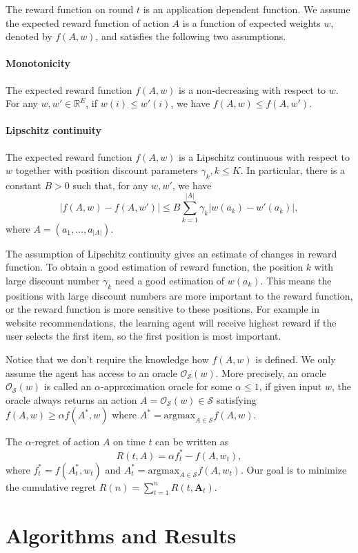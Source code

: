 \documentclass{article}
\newcommand{\RR}{\mathbb{R}}
\newcommand{\bA}{\mathbf{A}}
\newcommand{\cO}{\mathcal{O}}
\newcommand{\cS}{\mathcal{S}}
\newcommand{\argmax}{\mathrm{argmax}}
\begin{document}
The reward function on round $t$ is an application dependent function. We assume the expected reward function of action $A$ is a function of expected weights $w$, denoted by $f(A,w)$, and satisfies the following two assumptions.

\paragraph{Monotonicity}
The expected reward function $f(A, w)$ is a non-decreasing with respect to $w$. For any $w,w'\in \RR^E$, if $w(i) \leq w'(i)$, we have $f(A, w) \leq f(A, w')$.

\paragraph{Lipschitz continuity}
The expected reward function $f(A, w)$ is a Lipschitz continuous with respect to $w$ together with position discount parameters $\gamma_k, k\leq K$. In particular, there is a constant $B>0$ such that, for any $w,w'$, we have
$$
	|f(A, w) - f(A, w')| \leq B \sum_{k=1}^{|A|} \gamma_k |w(a_k) - w'(a_k)|,
$$
where $A = (a_1, \ldots, a_{|A|})$.

The assumption of Lipschitz continuity gives an estimate of changes in reward function. To obtain a good estimation of reward function, the position $k$ with large discount number $\gamma_k$ need a good estimation of $w(a_k)$. This means the positions with large discount numbers are more important to the reward function, or the reward function is more sensitive to these positions. For example in website recommendations, the learning agent will receive highest reward if the user selects the first item, so the first position is most important. 

Notice that we don't require the knowledge how $f(A, w)$ is defined. We only assume the agent has access to an oracle $\cO_{\cS}(w)$. More precisely, an oracle $\cO_{\cS}(w)$ is  called an $\alpha$-approximation oracle for some $\alpha \leq 1$, if given input $w$, the oracle always returns an action $A = \cO_{\cS}(w) \in \cS$ satisfying $f(A,w) \geq \alpha f(A^*,w)$ where $A^* = \argmax_{A\in\cS} f(A, w)$.

The $\alpha$-regret of action $A$ on time $t$ can be written as
$$
R(t, A) = \alpha f_t^{\ast} - f(A, w_t),
$$
where $f_t^{\ast} = f(A_t^*, w_t)$ and $A_t^* = \argmax_{A\in\cS} f(A, w_t)$. Our goal is to minimize the cumulative regret $R(n) = \sum_{t=1}^n R(t, \bA_t)$.

\section{Algorithms and Results}
\end{document}
